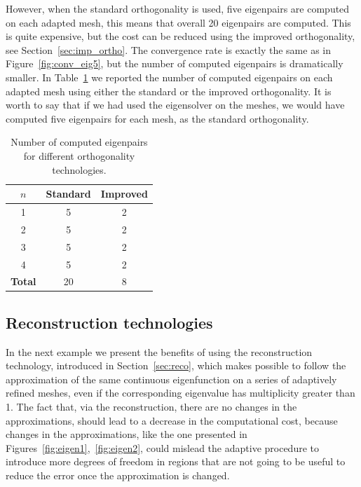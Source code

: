 \documentclass[preprint,12pt]{elsarticle}
\begin{document}

However, when the standard orthogonality is used, five eigenpairs are computed on each adapted mesh, this means that overall 20 eigenpairs are computed. This is quite expensive, but the cost can be reduced using the improved orthogonality, see Section~\ref{sec:imp_ortho}. The convergence rate is exactly the same as in Figure~\ref{fig:conv_eig5}, but the number of computed eigenpairs is dramatically smaller. In Table~\ref{tab:imp_orhto} we reported the number of computed eigenpairs on each adapted mesh using either the standard or the improved orthogonality.
It is worth to say that if we had used the eigensolver on the meshes, we would have computed five eigenpairs for each mesh, as the standard orthogonality.

\begin{table}[h]
\begin{center}

\begin{tabular}{|c|c|c|}
\hline
$n$ &  Standard &Improved\\
\hline
\hline
1 & 5 & 2\\
\hline
2 & 5 & 2\\
\hline
3 & 5 & 2\\
\hline
4 & 5 & 2\\
\hline \hline
\bf{Total} & 20 & 8\\
\hline
\end{tabular}
\end{center}

\caption{Number of computed eigenpairs for different orthogonality technologies.}\label{tab:imp_orhto}
\end{table}

\subsection{Reconstruction technologies}\label{ssec:n_rec}

In the next example we present the benefits of using the reconstruction technology, introduced in Section~\ref{sec:reco}, which makes possible to follow the approximation of the same continuous eigenfunction on a series of adaptively refined meshes, even if the corresponding eigenvalue has multiplicity greater than 1. The fact that, via the reconstruction, there are no changes in the approximations, should lead to a decrease in the computational cost, because changes in the approximations, like the one presented in Figures~\ref{fig:eigen1},~\ref{fig:eigen2}, could mislead the adaptive procedure to introduce more degrees of freedom in regions that are not going to be useful to reduce the error once the approximation is changed.
\end{document}

